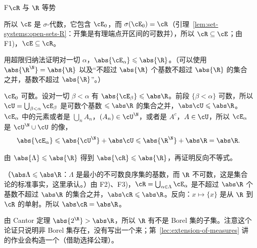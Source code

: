 \begin{probleme}{F}{$\cR$ 与 $\R$ 等势}
\begin{questions}
\begin{solution}
所以 $\cE$ 是 $\sigma$-代数，它包含 $\cE_0$，而 $\sigma(\cE_0)=\cR$（引理~\ref{lem:set-systems:open-sets-R}：开集是有理端点开区间的可数并），所以 $\cR\subseteq\cE$；由 F1)，$\cE\subseteq\cR$。
\end{solution}
\item 用超限归纳法证明对一切 $\alpha$，$\abs{\cE_\alpha}\leqslant\abs{\R}$。（可以使用 $\abs{\R^\N}=\abs{\R}$ 以及“不超过 $\abs{\R}$ 个基数不超过 $\abs{\R}$ 的集合之并，基数不超过 $\abs{\R}$”。）
\begin{solution}
$\cE_0$ 可数。设对一切 $\beta<\alpha$ 有 $\abs{\cE_\beta}\leqslant\abs\R$。前段 $\{\beta<\alpha\}$ 可数，所以 $\cU=\bigcup_{\beta<\alpha}\cE_\beta$ 是可数个基数 $\leqslant\abs\R$ 的集合之并，$\abs\cU\leqslant\abs\R$。$\cE_\alpha$ 中的元素或者是 $\bigcup_nA_n$，$(A_n)\in\cU^\N$，或者是 $A^c$，$A\in\cU$，所以 $\cE_\alpha$ 是 $\cU^\N\cup\cU$ 的像，
\[
\abs{\cE_\alpha}\leqslant\abs{\cU^\N}+\abs\cU\leqslant\abs{\R^\N}+\abs\R=\abs\R .
\]
\end{solution}
\item 由 $\abs{\Lambda}\leqslant\abs{\R}$ 得到 $\abs{\cR}\leqslant\abs{\R}$，再证明反向不等式。
\begin{solution}
（$\abs\Lambda\leqslant\abs\R$：$\Lambda$ 是最小的不可数良序集的基数，而 $\R$ 不可数，这是集合论的标准事实，这里承认。）由 F2)、F3)，$\cR=\bigcup_{\alpha\in\Lambda}\cE_\alpha$ 是不超过 $\abs\R$ 个基数不超过 $\abs\R$ 的集合之并，$\abs\cR\leqslant\abs\R$。反向：$x\mapsto\{x\}$ 是从 $\R$ 到 $\cR$ 的单射。所以 $\abs\cR=\abs\R$。

由 Cantor 定理 $\abs{2^\R}>\abs\R$，所以 $\R$ 有不是 Borel 集的子集。注意这个论证只说明非 Borel 集存在，没有写出一个来；第~\ref{lec:extension-of-measures} 讲的作业会构造一个（借助选择公理）。
\end{solution}
\end{questions}
\end{probleme}
